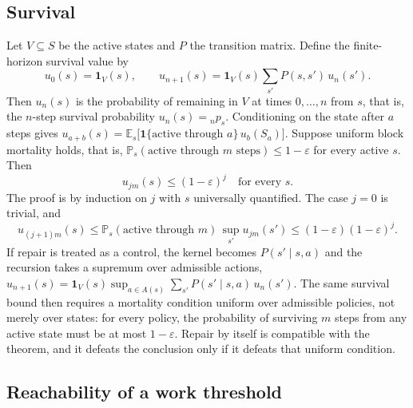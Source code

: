 \documentclass[11pt]{article}
\theoremstyle{definition}
\theoremstyle{remark}
\newcommand{\E}{\mathbb{E}}
\renewcommand{\Pr}{\mathbb{P}}
\begin{document}
\subsection{Survival}

Let $V \subseteq S$ be the active states and $P$ the transition matrix. Define the finite-horizon survival value by
\[
u_0(s) = \mathbf 1_V(s),
\qquad
u_{n+1}(s) = \mathbf 1_V(s) \sum_{s'} P(s,s')\, u_n(s').
\]
Then $u_n(s)$ is the probability of remaining in $V$ at times $0,\dots,n$ from $s$, that is, the $n$-step survival probability $u_n(s) = {}_{n}p_{s}$. Conditioning on the state after $a$ steps gives $u_{a+b}(s) = \E_s\big[\mathbf 1\{\text{active through } a\}\, u_b(S_a)\big]$. Suppose uniform block mortality holds, that is, $\Pr_s(\text{active through } m \text{ steps}) \le 1-\varepsilon$ for every active $s$. Then
\[
u_{jm}(s) \le (1-\varepsilon)^j \quad \text{for every } s .
\]
The proof is by induction on $j$ with $s$ universally quantified. The case $j=0$ is trivial, and
\[
u_{(j+1)m}(s) \le \Pr_s(\text{active through } m)\, \sup_{s'} u_{jm}(s') \le (1-\varepsilon)(1-\varepsilon)^j .
\]
If repair is treated as a control, the kernel becomes $P(s' \mid s, a)$ and the recursion takes a supremum over admissible actions, $u_{n+1}(s) = \mathbf 1_V(s) \sup_{a \in A(s)} \sum_{s'} P(s' \mid s, a)\, u_n(s')$. The same survival bound then requires a mortality condition uniform over admissible policies, not merely over states: for every policy, the probability of surviving $m$ steps from any active state must be at most $1-\varepsilon$. Repair by itself is compatible with the theorem, and it defeats the conclusion only if it defeats that uniform condition.

\subsection{Reachability of a work threshold}
\end{document}
